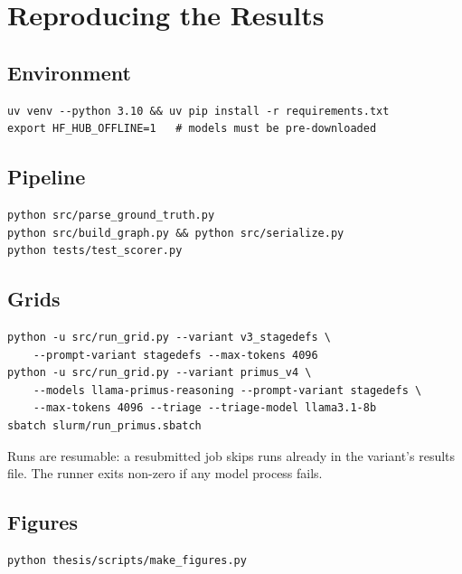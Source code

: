 \chapter{Reproducing the Results}
\label{app:repro}
\section{Environment}
\begin{verbatim}
uv venv --python 3.10 && uv pip install -r requirements.txt
export HF_HUB_OFFLINE=1   # models must be pre-downloaded
\end{verbatim}
\section{Pipeline}
\begin{verbatim}
python src/parse_ground_truth.py
python src/build_graph.py && python src/serialize.py
python tests/test_scorer.py
\end{verbatim}
\section{Grids}
\begin{verbatim}
python -u src/run_grid.py --variant v3_stagedefs \
    --prompt-variant stagedefs --max-tokens 4096
python -u src/run_grid.py --variant primus_v4 \
    --models llama-primus-reasoning --prompt-variant stagedefs \
    --max-tokens 4096 --triage --triage-model llama3.1-8b
sbatch slurm/run_primus.sbatch
\end{verbatim}
Runs are resumable: a resubmitted job skips runs already in the variant's results file. The runner exits non-zero if any model process fails.
\section{Figures}
\begin{verbatim}
python thesis/scripts/make_figures.py
\end{verbatim}
